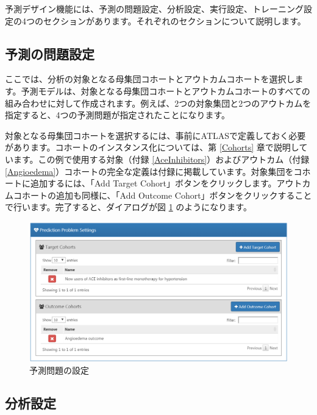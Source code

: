 \documentclass[
  11pt]{book}
\theoremstyle{definition}
\theoremstyle{definition}
\theoremstyle{definition}
\theoremstyle{definition}
\theoremstyle{remark}
\begin{document}
予測デザイン機能には、予測の問題設定、分析設定、実行設定、トレーニング設定の4つのセクションがあります。それぞれのセクションについて説明します。

\subsection{予測の問題設定}\label{ux4e88ux6e2cux306eux554fux984cux8a2dux5b9a}

ここでは、分析の対象となる母集団コホートとアウトカムコホートを選択します。予測モデルは、対象となる母集団コホートとアウトカムコホートのすべての組み合わせに対して作成されます。例えば、2つの対象集団と2つのアウトカムを指定すると、4つの予測問題が指定されたことになります。

対象となる母集団コホートを選択するには、事前にATLASで定義しておく必要があります。コホートのインスタンス化については、第 \ref{Cohorts} 章で説明しています。この例で使用する対象（付録 \ref{AceInhibitors}）およびアウトカム（付録 \ref{Angioedema}）コホートの完全な定義は付録に掲載しています。対象集団をコホートに追加するには、「Add Target Cohort」ボタンをクリックします。アウトカムコホートの追加も同様に、「Add Outcome Cohort」ボタンをクリックすることで行います。完了すると、ダイアログが図 \ref{fig:problemSettings} のようになります。

\begin{figure}

{\centering \includegraphics[width=1\linewidth]{images/PatientLevelPrediction/problemSettings} 

}

\caption{予測問題の設定}\label{fig:problemSettings}
\end{figure}

\subsection{分析設定}\label{ux5206ux6790ux8a2dux5b9a}
\end{document}
